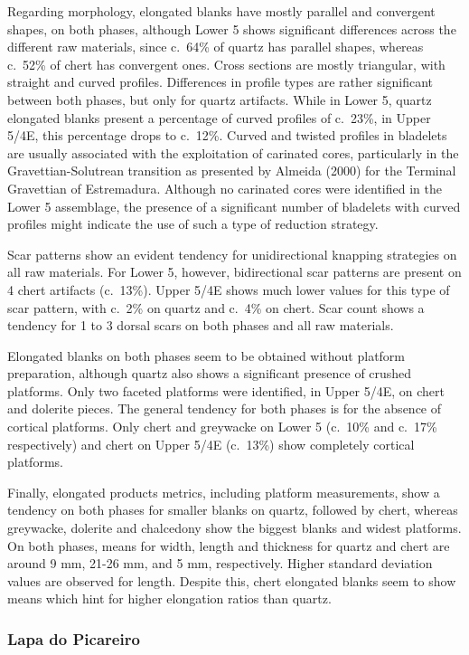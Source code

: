 \documentclass[12pt,twoside]{reedthesis}
\begin{document}
Regarding morphology, elongated blanks have mostly parallel and convergent shapes, on both phases, although Lower 5 shows significant differences across the different raw materials, since c.~64\% of quartz has parallel shapes, whereas c.~52\% of chert has convergent ones. Cross sections are mostly triangular, with straight and curved profiles. Differences in profile types are rather significant between both phases, but only for quartz artifacts. While in Lower 5, quartz elongated blanks present a percentage of curved profiles of c.~23\%, in Upper 5/4E, this percentage drops to c.~12\%. Curved and twisted profiles in bladelets are usually associated with the exploitation of carinated cores, particularly in the Gravettian-Solutrean transition as presented by Almeida (2000) for the Terminal Gravettian of Estremadura. Although no carinated cores were identified in the Lower 5 assemblage, the presence of a significant number of bladelets with curved profiles might indicate the use of such a type of reduction strategy.

Scar patterns show an evident tendency for unidirectional knapping strategies on all raw materials. For Lower 5, however, bidirectional scar patterns are present on 4 chert artifacts (c.~13\%). Upper 5/4E shows much lower values for this type of scar pattern, with c.~2\% on quartz and c.~4\% on chert. Scar count shows a tendency for 1 to 3 dorsal scars on both phases and all raw materials.

Elongated blanks on both phases seem to be obtained without platform preparation, although quartz also shows a significant presence of crushed platforms. Only two faceted platforms were identified, in Upper 5/4E, on chert and dolerite pieces. The general tendency for both phases is for the absence of cortical platforms. Only chert and greywacke on Lower 5 (c.~10\% and c.~17\% respectively) and chert on Upper 5/4E (c.~13\%) show completely cortical platforms.

Finally, elongated products metrics, including platform measurements, show a tendency on both phases for smaller blanks on quartz, followed by chert, whereas greywacke, dolerite and chalcedony show the biggest blanks and widest platforms. On both phases, means for width, length and thickness for quartz and chert are around 9 mm, 21-26 mm, and 5 mm, respectively. Higher standard deviation values are observed for length. Despite this, chert elongated blanks seem to show means which hint for higher elongation ratios than quartz.

\hypertarget{lapa-do-picareiro-6}{%
\subsubsection{Lapa do Picareiro}\label{lapa-do-picareiro-6}}
\end{document}
